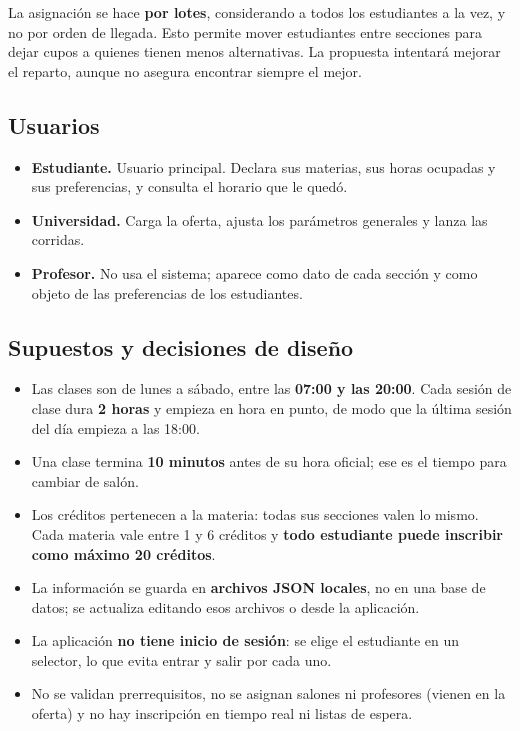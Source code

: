 \documentclass[pdflatex,sn-mathphys-num]{sn-jnl}%
\begin{document}
La asignación se hace \textbf{por lotes}, considerando a todos los estudiantes a la vez, y no por orden de llegada. Esto permite mover estudiantes entre secciones para dejar cupos a quienes tienen menos alternativas. La propuesta intentará mejorar el reparto, aunque no asegura encontrar siempre el mejor.

\subsection{Usuarios}

\begin{itemize}
\item \textbf{Estudiante.} Usuario principal. Declara sus materias, sus horas ocupadas y sus preferencias, y consulta el horario que le quedó.
\item \textbf{Universidad.} Carga la oferta, ajusta los parámetros generales y lanza las corridas.
\item \textbf{Profesor.} No usa el sistema; aparece como dato de cada sección y como objeto de las preferencias de los estudiantes.
\end{itemize}

\subsection{Supuestos y decisiones de diseño}\label{sec:supuestos}

\begin{itemize}
\item Las clases son de lunes a sábado, entre las \textbf{07:00 y las 20:00}. Cada sesión de clase dura \textbf{2 horas} y empieza en hora en punto, de modo que la última sesión del día empieza a las 18:00.
\item Una clase termina \textbf{10 minutos} antes de su hora oficial; ese es el tiempo para cambiar de salón.
\item Los créditos pertenecen a la materia: todas sus secciones valen lo mismo. Cada materia vale entre 1 y 6 créditos y \textbf{todo estudiante puede inscribir como máximo 20 créditos}.
\item La información se guarda en \textbf{archivos JSON locales}, no en una base de datos; se actualiza editando esos archivos o desde la aplicación.
\item La aplicación \textbf{no tiene inicio de sesión}: se elige el estudiante en un selector, lo que evita entrar y salir por cada uno.
\item No se validan prerrequisitos, no se asignan salones ni profesores (vienen en la oferta) y no hay inscripción en tiempo real ni listas de espera.
\end{itemize}
\end{document}
